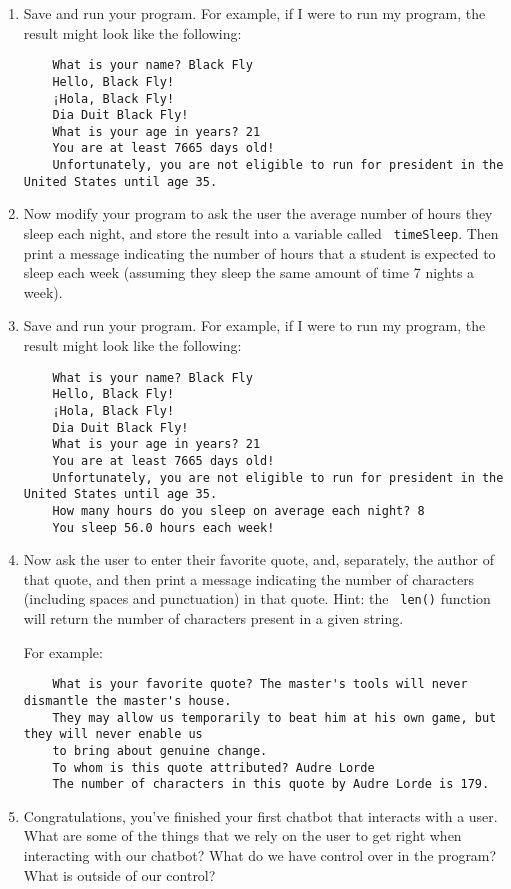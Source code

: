 \documentclass[10pt]{article}
\begin{document}
\begin{enumerate}
    \item Save and run your program.  
        For example, if I were to run my program, the result might look like
        the following:
\begin{verbatim}
    What is your name? Black Fly
    Hello, Black Fly!
    ¡Hola, Black Fly!
    Dia Duit Black Fly!
    What is your age in years? 21
    You are at least 7665 days old!
    Unfortunately, you are not eligible to run for president in the United States until age 35.
\end{verbatim}

    \item Now modify your program to ask the user the average number of hours
    they sleep each night, and store the result into a variable called {\tt
    timeSleep}. 
    Then print a message indicating the number of hours that a student is
    expected to sleep each week (assuming they sleep the same amount of time 7 nights a week).

    \item Save and run your program.
        For example, if I were to run my program, the result might look like
        the following:
\begin{verbatim}
    What is your name? Black Fly
    Hello, Black Fly!
    ¡Hola, Black Fly!
    Dia Duit Black Fly!
    What is your age in years? 21
    You are at least 7665 days old!
    Unfortunately, you are not eligible to run for president in the United States until age 35.
    How many hours do you sleep on average each night? 8
    You sleep 56.0 hours each week!
\end{verbatim}

    \item Now ask the user to enter their favorite quote, and, separately,
the author of that quote, and then print a message indicating the number of
characters (including spaces and punctuation) in that quote.  Hint: the {\tt
len()} function will return the number of characters present in a given string.

For example:
\begin{verbatim}
    What is your favorite quote? The master's tools will never dismantle the master's house. 
    They may allow us temporarily to beat him at his own game, but they will never enable us 
    to bring about genuine change.
    To whom is this quote attributed? Audre Lorde
    The number of characters in this quote by Audre Lorde is 179.
\end{verbatim}

\item Congratulations, you've finished your first chatbot that interacts with a user. What are some of the things that we rely on the user to get right when interacting with our chatbot? What do we have control over in the program? What is outside of our control?

  \end{enumerate}
\end{document}
